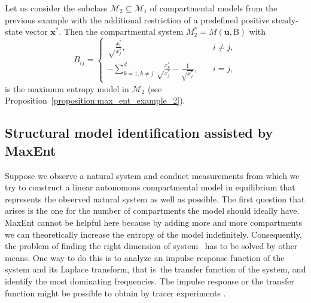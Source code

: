 \documentclass[smallextended]{svjour3}
\makeatletter
\renewcommand*{\eqref}[1]{%
  \hyperref[{#1}]{\textup{\tagform@{\ref*{#1}}}}%
}
\renewcommand{\tens}[1]{\mathrm{#1}}
\renewcommand{\vec}[1]{\mathbf{#1}}
\newcommand{\suml}{\sum\limits}
\newcommand{\ie}{that is}
\makeatother
\begin{document}
\begin{example}
\label{max_ent_example_2}
Let us consider the subclass $\mathcal{M}_2\subseteq\mathcal{M}_1$ of compartmental models from the previous example with the additional restriction of a predefined positive steady-state vector $\vec{x}^\ast$.
Then the compartmental system $M^\ast_2=M(\vec{u},\tens{B})$ with
\begin{equation}
	B_{ij} = \begin{cases}
    \sqrt\frac{x_i^\ast}{x_j^\ast},\quad & i\neq j,\\
		-\suml_{k=1,k\neq j}^d \sqrt\frac{x_k^\ast}{x_j^\ast} - \frac{1}{\sqrt{x_j^\ast}}, \quad &i=j,
		\end{cases}
  \end{equation}
is the maximum entropy model in $\mathcal{M}_2$ (see Proposition~\ref{proposition:max_ent_example_2}).
\end{example}


\subsection{Structural model identification assisted by MaxEnt}
Suppose we observe a natural system and conduct measurements from which we try to construct a linear autonomous compartmental model in equilibrium that represents the observed natural system as well as possible.
The first question that arises is the one for the number of compartments the model should ideally have.
MaxEnt cannot be helpful here because by adding more and more compartments we can theoretically increase the entropy of the model indefinitely.
Consequently, the problem of finding the right dimension of system~\eqref{eqn:lin_CS_sys} has to be solved by other means.
One way to do this is to analyze an impulse response function of the system and its Laplace transform, \ie\ the transfer function of the system, and identify the most dominating frequencies.
The impulse response or the transfer function might be possible to obtain by tracer experiments \citep{Anderson1983, Walter1986MBS}.
\end{document}
